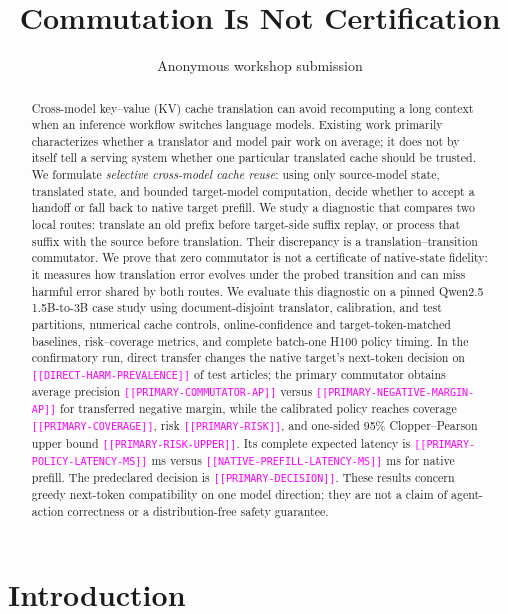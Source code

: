 \documentclass[10pt,twocolumn]{article}
\title{Commutation Is Not Certification}
\author{Anonymous workshop submission}
\date{}
\newcommand{\result}[1]{\textcolor{magenta}{\texttt{[[#1]]}}}
\begin{document}
\maketitle

\begin{abstract}
Cross-model key--value (KV) cache translation can avoid recomputing a long
context when an inference workflow switches language models.  Existing work
primarily characterizes whether a translator and model pair work on average;
it does not by itself tell a serving system whether one particular translated
cache should be trusted.  We formulate \emph{selective cross-model cache
reuse}: using only source-model state, translated state, and bounded
target-model computation, decide whether to accept a handoff or fall back to
native target prefill.  We study a diagnostic that compares two local routes:
translate an old prefix before target-side suffix replay, or process that
suffix with the source before translation.  Their discrepancy is a
translation--transition commutator.  We prove that zero commutator is not a
certificate of native-state fidelity: it measures how translation error
evolves under the probed transition and can miss harmful error shared by both
routes.  We evaluate this diagnostic on a pinned Qwen2.5 1.5B-to-3B case study
using document-disjoint translator, calibration, and test partitions,
numerical cache controls, online-confidence and target-token-matched baselines,
risk--coverage metrics, and complete batch-one H100 policy timing.  In the
confirmatory run, direct transfer changes the native target's next-token
decision on \result{DIRECT-HARM-PREVALENCE} of test articles; the primary
commutator obtains average precision \result{PRIMARY-COMMUTATOR-AP} versus
\result{PRIMARY-NEGATIVE-MARGIN-AP} for transferred negative margin, while the calibrated
policy reaches coverage \result{PRIMARY-COVERAGE}, risk
\result{PRIMARY-RISK}, and one-sided 95\% Clopper--Pearson upper bound
\result{PRIMARY-RISK-UPPER}.  Its complete expected latency is
\result{PRIMARY-POLICY-LATENCY-MS} ms versus
\result{NATIVE-PREFILL-LATENCY-MS} ms for native prefill.  The predeclared
decision is \result{PRIMARY-DECISION}.  These results concern greedy
next-token compatibility on one model direction; they are not a claim of
agent-action correctness or a distribution-free safety guarantee.
\end{abstract}

\section{Introduction}
\end{document}
